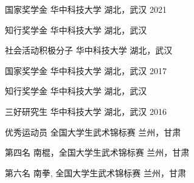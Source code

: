 


\vspace{-1.5mm}
\begin{cvhonors}

\cvhonor
{国家奖学金} %
{华中科技大学} %
{湖北，武汉} %
{2021} 

\cvhonor
{知行奖学金} %
{华中科技大学} %
{湖北，武汉} %
{} %

\cvhonor
{社会活动积极分子} %
{华中科技大学} %
{湖北，武汉} %
{} %

\cvhonor
{国家奖学金} %
{华中科技大学} %
{湖北，武汉} %
{2017} %

\cvhonor
{知行奖学金} %
{华中科技大学} %
{湖北，武汉} %
{} %


\cvhonor
{三好研究生} %
{华中科技大学} %
{湖北，武汉} %
{2016} %




\cvhonor
{优秀运动员} %
{全国大学生武术锦标赛} %
{兰州，甘肃} %
{ } %


\cvhonor
{第四名} %
{南棍，全国大学生武术锦标赛} %
{兰州，甘肃} %
{ } %


\cvhonor
{第六名} %
{南拳, 全国大学生武术锦标赛} %
{兰州，甘肃} %
{ } %


\end{cvhonors}
